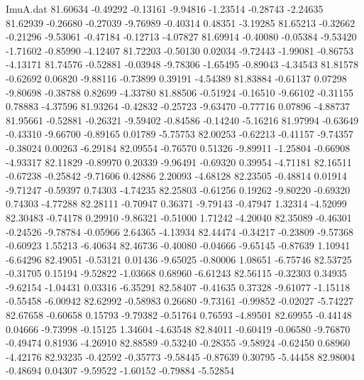 \begin{filecontents}{ImuA.dat}
  81.60634   -0.49292   -0.13161   -9.94816   -1.23514   -0.28743   -2.24635
  81.62939   -0.26680   -0.27039   -9.76989   -0.40314    0.48351   -3.19285
  81.65213   -0.32662   -0.21296   -9.53061   -0.47184   -0.12713   -4.07827
  81.69914   -0.40080   -0.05384   -9.53420   -1.71602   -0.85990   -4.12407
  81.72203   -0.50130    0.02034   -9.72443   -1.99081   -0.86753   -4.13171
  81.74576   -0.52881   -0.03948   -9.78306   -1.65495   -0.89043   -4.34543
  81.81578   -0.62692    0.06820   -9.88116   -0.73899    0.39191   -4.54389
  81.83884   -0.61137    0.07298   -9.80698   -0.38788    0.82699   -4.33780
  81.88506   -0.51924   -0.16510   -9.66102   -0.31155    0.78883   -4.37596
  81.93264   -0.42832   -0.25723   -9.63470   -0.77716    0.07896   -4.88737
  81.95661   -0.52881   -0.26321   -9.59402   -0.84586   -0.14240   -5.16216
  81.97994   -0.63649   -0.43310   -9.66700   -0.89165    0.01789   -5.75753
  82.00253   -0.62213   -0.41157   -9.74357   -0.38024    0.00263   -6.29184
  82.09554   -0.76570    0.51326   -9.89911   -1.25804   -0.66908   -4.93317
  82.11829   -0.89970    0.20339   -9.96491   -0.69320    0.39954   -4.71181
  82.16511   -0.67238   -0.25842   -9.71606    0.42886    2.20093   -4.68128
  82.23505   -0.48814    0.01914   -9.71247   -0.59397    0.74303   -4.74235
  82.25803   -0.61256    0.19262   -9.80220   -0.69320    0.74303   -4.77288
  82.28111   -0.70947    0.36371   -9.79143   -0.47947    1.32314   -4.52099
  82.30483   -0.74178    0.29910   -9.86321   -0.51000    1.71242   -4.20040
  82.35089   -0.46301   -0.24526   -9.78784   -0.05966    2.64365   -4.13934
  82.44474   -0.34217   -0.23809   -9.57368   -0.60923    1.55213   -6.40634
  82.46736   -0.40080   -0.04666   -9.65145   -0.87639    1.10941   -6.64296
  82.49051   -0.53121    0.01436   -9.65025   -0.80006    1.08651   -6.75746
  82.53725   -0.31705    0.15194   -9.52822   -1.03668    0.68960   -6.61243
  82.56115   -0.32303    0.34935   -9.62154   -1.04431    0.03316   -6.35291
  82.58407   -0.41635    0.37328   -9.61077   -1.15118   -0.55458   -6.00942
  82.62992   -0.58983    0.26680   -9.73161   -0.99852   -0.02027   -5.74227
  82.67658   -0.60658    0.15793   -9.79382   -0.51764    0.76593   -4.89501
  82.69955   -0.44148    0.04666   -9.73998   -0.15125    1.34604   -4.63548
  82.84011   -0.60419   -0.06580   -9.76870   -0.49474    0.81936   -4.26910
  82.88589   -0.53240   -0.28355   -9.58924   -0.62450    0.68960   -4.42176
  82.93235   -0.42592   -0.35773   -9.58445   -0.87639    0.30795   -5.44458
  82.98004   -0.48694    0.04307   -9.59522   -1.60152   -0.79884   -5.52854

\end{filecontents}
